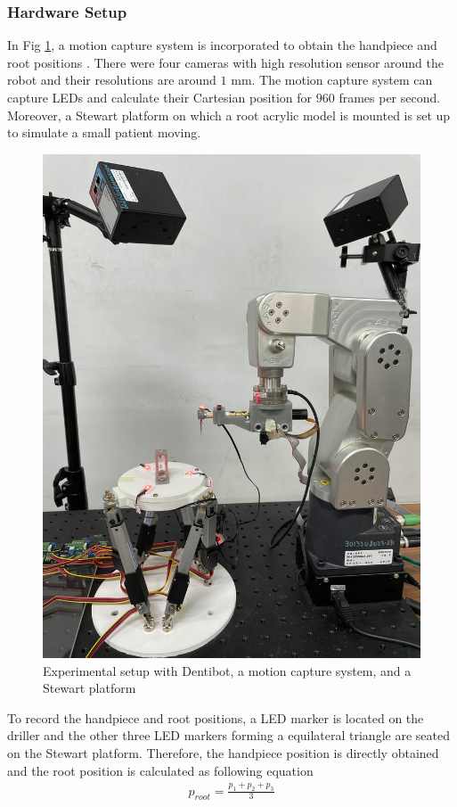 \subsubsection{Hardware Setup}
\hspace*{6mm}In Fig \ref{fig:system}, a motion capture system is incorporated to obtain the handpiece and root positions \cite{web8}. There were four cameras with high resolution sensor around the robot and their resolutions are around $1$ mm. The motion capture system can capture LEDs and calculate their Cartesian position for $960$ frames per second. Moreover, a Stewart platform on which a root acrylic model is mounted is set up to simulate a small patient moving. 
\begin{figure}[htbp]
\begin{center}
\includegraphics[width=0.6\linewidth]{Images/System.jpg}
\caption{Experimental setup with Dentibot, a motion capture system, and a Stewart platform}
\label{fig:system}
\end{center}
\end{figure}
\par
To record the handpiece and root positions, a LED marker is located on the driller and the other three LED markers forming a equilateral triangle are seated on the Stewart platform. Therefore, the handpiece position is directly obtained and the root position is calculated as following equation
\begin{equation*}
\begin{split}
p_{root} = \frac{p_{1} + p_{2} + p_{3}}{3}
\end{split}
\end{equation*}
